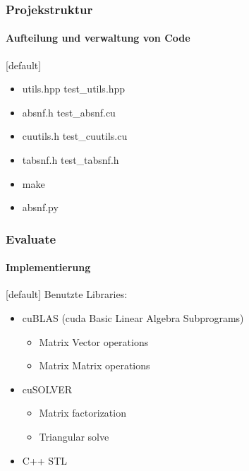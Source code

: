 \begin{frame}
\frametitle{Projekstruktur}
\framesubtitle{Aufteilung und verwaltung von Code}
[default]

\begin{itemize}
	\item utils.hpp test\_utils.hpp
	\item absnf.h test\_absnf.cu
	\item cuutils.h test\_cuutils.cu
	\item tabsnf.h test\_tabsnf.h
	\item make
	\item absnf.py
\end{itemize}

\end{frame}
\begin{frame}
	\frametitle{Evaluate}
	\framesubtitle{Implementierung}
	[default]
	Benutzte Libraries:
	\begin{itemize}
		\item cuBLAS (cuda Basic Linear Algebra Subprograms)
		\begin{itemize}
			\item Matrix Vector operations
			\item Matrix Matrix operations
		\end{itemize}
		\item cuSOLVER
		\begin{itemize}
			\item Matrix factorization
			\item Triangular solve
		\end{itemize}
		\item C++ STL
	\end{itemize}
	
\end{frame}
